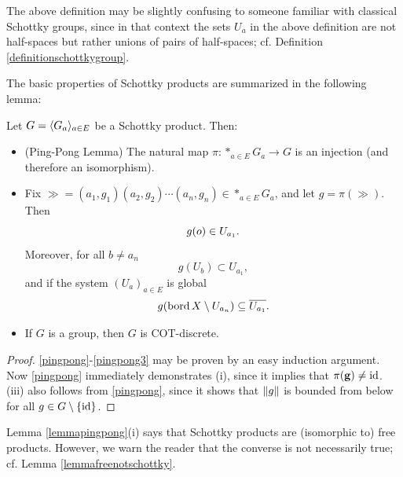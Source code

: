 \begin{remark*}
The above definition may be slightly confusing to someone familiar with classical Schottky groups, since in that context the sets $U_a$ in the above definition are not half-spaces but rather unions of pairs of half-spaces; cf. Definition \ref{definitionschottkygroup}.
\end{remark*}

The basic properties of Schottky products are summarized in the following lemma:

\begin{lemma}
\label{lemmapingpong}
Let $G = \langle G_a\rangle_{a\in E}$ be a Schottky product. Then:
\begin{itemize}
\item[(i)] (Ping-Pong Lemma) The natural map $\pi:\ast_{a\in E} G_a\to G$ is an injection (and therefore an isomorphism).
\item[(ii)] Fix $\gg = (a_1,g_1)(a_2,g_2)\cdots(a_n,g_n)\in\ast_{a\in E}G_a$, and let $g = \pi(\gg)$. Then
\begin{equation}
\label{pingpong}
g(o)\in U_{a_1}.
\end{equation}
Moreover, for all $b\neq a_n$
\begin{equation}
\label{pingpong2}
g(U_b) \subset U_{a_1},
\end{equation}
and if the system $(U_a)_{a\in E}$ is global
\begin{equation}
\label{pingpong3}
g(\operatorname{bord} X\setminus U_{a_n}) \subseteq \overline{U_{a_1}}.
\end{equation}
\item[(iii)] If $G$ is a group, then $G$ is COT-discrete.
\end{itemize}
\end{lemma}
\begin{proof}
\eqref{pingpong}-\eqref{pingpong3} may be proven by an easy induction argument. Now \eqref{pingpong} immediately demonstrates (i), since it implies that $\pi(\mathbf g)\neq\mathrm{id}$. (iii) also follows from \eqref{pingpong}, since it shows that $\|g\|$ is bounded from below for all $g\in G\setminus\{\mathrm{id}\}$.
\end{proof}
\begin{remark}
Lemma \ref{lemmapingpong}(i) says that Schottky products are (isomorphic to) free products. However, we warn the reader that the converse is not necessarily true; cf. Lemma \ref{lemmafreenotschottky}.
\end{remark}

